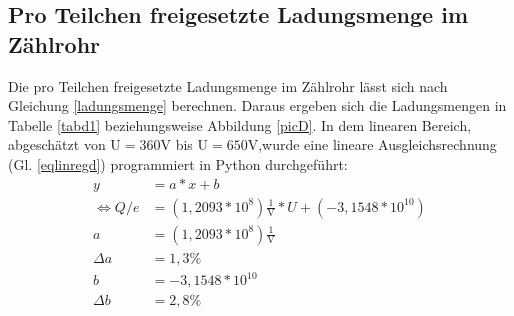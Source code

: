 \subsection{Pro Teilchen freigesetzte Ladungsmenge im Zählrohr}
\FloatBarrier
Die pro Teilchen freigesetzte Ladungsmenge im Zählrohr lässt sich nach Gleichung \ref{ladungsmenge}
berechnen.
Daraus ergeben sich die Ladungsmengen in Tabelle \ref{tabd1} beziehungsweise Abbildung \ref{picD}.
In dem linearen Bereich, abgeschätzt von U$=360$V bis U$=650$V,wurde eine lineare Ausgleichsrechnung \cite{linreg} (Gl. \ref{eqlinregd}) 
programmiert in Python durchgeführt:
\begin{align}
y&=a*x+b \\
\Leftrightarrow Q/e&=(1,2093 * 10^8) \frac{1}{\text{V}} *U+ (-3,1548 * 10^10) \label{eqlinregd} \\
a&=(1,2093 * 10^8) \frac{1}{\text{V}} \label{eqalinregd}\\
\Delta a&=1,3\% \\
b&=-3,1548 * 10^10\\
\Delta b&=2,8\%
\end{align}
 
\FloatBarrier